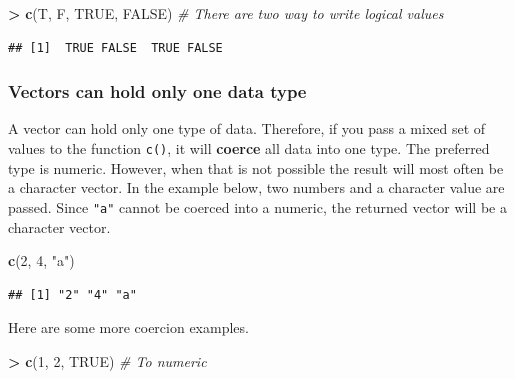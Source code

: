 \documentclass[]{book}
\newenvironment{Shaded}{\begin{snugshade}}{\end{snugshade}}
\newcommand{\CommentTok}[1]{\textcolor[rgb]{0.56,0.35,0.01}{\textit{#1}}}
\newcommand{\DecValTok}[1]{\textcolor[rgb]{0.00,0.00,0.81}{#1}}
\newcommand{\KeywordTok}[1]{\textcolor[rgb]{0.13,0.29,0.53}{\textbf{#1}}}
\newcommand{\NormalTok}[1]{#1}
\newcommand{\OperatorTok}[1]{\textcolor[rgb]{0.81,0.36,0.00}{\textbf{#1}}}
\newcommand{\OtherTok}[1]{\textcolor[rgb]{0.56,0.35,0.01}{#1}}
\newcommand{\StringTok}[1]{\textcolor[rgb]{0.31,0.60,0.02}{#1}}
\begin{document}
\begin{Shaded}
\begin{Highlighting}[]
\OperatorTok{>}\StringTok{ }\KeywordTok{c}\NormalTok{(T, F, }\OtherTok{TRUE}\NormalTok{, }\OtherTok{FALSE}\NormalTok{) }\CommentTok{# There are two way to write logical values}
\end{Highlighting}
\end{Shaded}

\begin{verbatim}
## [1]  TRUE FALSE  TRUE FALSE
\end{verbatim}

\hypertarget{vectors-can-hold-only-one-data-type}{%
\subsubsection*{Vectors can hold only one data type}\label{vectors-can-hold-only-one-data-type}}

A vector can hold only one type of data. Therefore, if you pass a mixed set of values to the function \texttt{c()}, it will \textbf{coerce} all data into one type. The preferred type is numeric. However, when that is not possible the result will most often be a character vector. In the example below, two numbers and a character value are passed. Since \texttt{"a"} cannot be coerced into a numeric, the returned vector will be a character vector.

\begin{Shaded}
\begin{Highlighting}[]
\KeywordTok{c}\NormalTok{(}\DecValTok{2}\NormalTok{, }\DecValTok{4}\NormalTok{, }\StringTok{"a"}\NormalTok{) }
\end{Highlighting}
\end{Shaded}

\begin{verbatim}
## [1] "2" "4" "a"
\end{verbatim}

Here are some more coercion examples.

\begin{Shaded}
\begin{Highlighting}[]
\OperatorTok{>}\StringTok{ }\KeywordTok{c}\NormalTok{(}\DecValTok{1}\NormalTok{, }\DecValTok{2}\NormalTok{, }\OtherTok{TRUE}\NormalTok{) }\CommentTok{# To numeric}
\end{Highlighting}
\end{Shaded}
\end{document}
